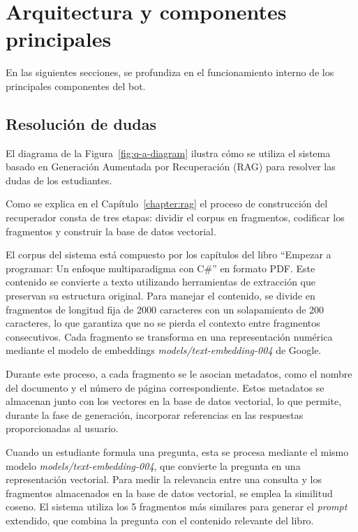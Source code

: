 \documentclass{article}
\begin{document}
\section{Arquitectura y componentes principales}

En las siguientes secciones, se profundiza en el funcionamiento interno de los principales componentes del bot.

\subsection{Resolución de dudas}

El diagrama de la Figura~\ref{fig:q-a-diagram} ilustra cómo se utiliza el sistema basado en Generación Aumentada por Recuperación (RAG) para resolver las dudas de los estudiantes.

Como se explica en el Capítulo~\ref{chapter:rag} el proceso de construcción del recuperador consta de tres etapas: dividir el corpus en fragmentos, codificar los fragmentos y construir la base de datos vectorial.

El corpus del sistema está compuesto por los capítulos del libro ``Empezar a programar: Un enfoque multiparadigma con C\#'' en formato PDF. Este contenido se convierte a texto utilizando herramientas de extracción que preservan su estructura original. Para manejar el contenido, se divide en fragmentos de longitud fija de 2000 caracteres con un solapamiento de 200 caracteres, lo que garantiza que no se pierda el contexto entre fragmentos consecutivos. Cada fragmento se transforma en una representación numérica mediante el modelo de embeddings \textit{models/text-embedding-004} de Google.

Durante este proceso, a cada fragmento se le asocian metadatos, como el nombre del documento y el número de página correspondiente. Estos metadatos se almacenan junto con los vectores en la base de datos vectorial, lo que permite, durante la fase de generación, incorporar referencias en las respuestas proporcionadas al usuario.

Cuando un estudiante formula una pregunta, esta se procesa mediante el mismo modelo \textit{models/text-embedding-004}, que convierte la pregunta en una representación vectorial. Para medir la relevancia entre una consulta y los fragmentos almacenados en la base de datos vectorial, se emplea la similitud coseno. El sistema utiliza los 5 fragmentos más similares para generar el \textit{prompt} extendido, que combina la pregunta con el contenido relevante del libro.
\end{document}
